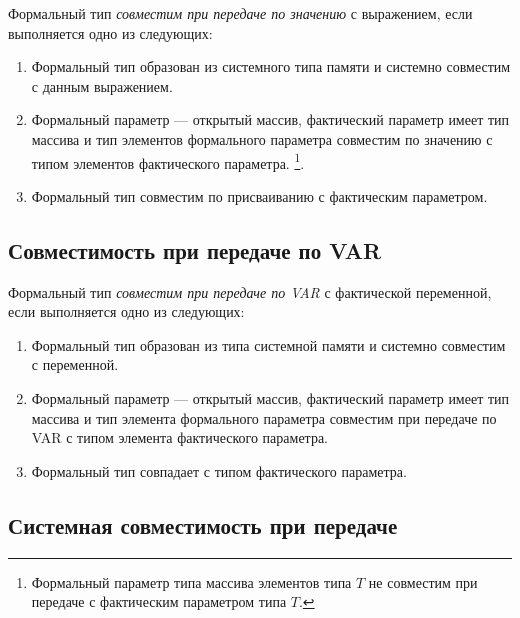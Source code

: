 Формальный тип {\em совместим при передаче по значению}  
с выражением, если выполняется одно из следующих:
\renewcommand{\theenumi}{\alph{enumi}}
\begin{enumerate}
\item   Формальный тип образован из системного типа памяти
и системно совместим с данным выражением.

\item   Формальный параметр --- открытый массив, фактический
параметр имеет тип массива и тип элементов формального
параметра совместим по значению с типом элементов фактического
параметра.
        \footnote{Формальный параметр типа массива элементов типа
$T$ не совместим при передаче с фактическим параметром типа $T$.}.

\item   Формальный тип совместим по присваиванию с фактическим параметром.
\end{enumerate}
\renewcommand{\theenumi}{\arabic{enumi}}

\subsection{Совместимость при передаче по VAR}

Формальный тип {\em совместим при передаче по VAR} 
с фактической переменной, если выполняется одно из следующих:
\renewcommand{\theenumi}{\alph{enumi}}
\begin{enumerate}
\item   Формальный тип образован из типа системной памяти
и системно совместим с переменной.

\item   Формальный параметр --- открытый массив, фактический параметр
имеет тип массива и тип элемента формального параметра
совместим при передаче по VAR с типом элемента фактического параметра.

\item   Формальный тип совпадает с типом фактического параметра.
\end{enumerate}
\renewcommand{\theenumi}{\arabic{enumi}}

\subsection{Системная совместимость при передаче}\label{m2:ISO:comp:system}

